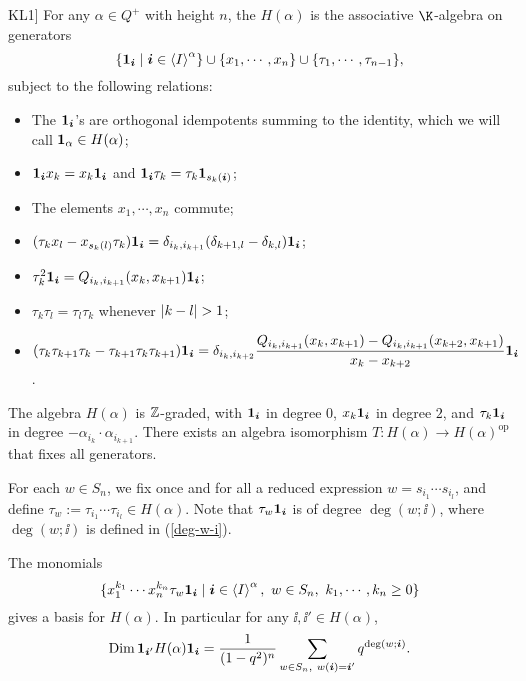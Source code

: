 \begin{definition}[\cite[Section 2.1]{KL1}]\label{def-of-KLR-alg}
    For any $\alpha\in Q^+$ with height $n$, the 
    $H(\alpha)$ is the associative $\K$-algebra on generators
    \[
        \{\mathbf{1}_{\boldsymbol{i}}\mid\boldsymbol{i}\in\left<I\right>^\alpha\}\cup\{x_1,\cdots,x_n\}
        \cup\{\tau_1,\cdots,\tau_{n-1}\},
    \]
    subject to the following relations:
    \begin{itemize}
        \item The $\mathbf{1}_{\boldsymbol{i}}$'s are orthogonal idempotents summing to the identity,
        which we will call $\mathbf{1}_\alpha\in H(\alpha)$;
        \item $\mathbf{1}_{\boldsymbol{i}} x_k = x_k \mathbf{1}_{\boldsymbol{i}}$ and $\mathbf{1}_{\boldsymbol{i}} \tau_k = \tau_k\mathbf{1}_{s_k(\boldsymbol{i})}$;
        \item The elements $x_1,\cdots,x_n$ commute;
        \item $(\tau_k x_l-x_{s_k(l)}\tau_k)\mathbf{1}_{\boldsymbol{i}}
         = \delta_{i_k,i_{k+1}}(\delta_{k+1,l}-\delta_{k,l})\mathbf{1}_{\boldsymbol{i}}$;
        \item $\tau_k^2\mathbf{1}_{\boldsymbol{i}} = Q_{i_k,i_{k+1}}(x_k,x_{k+1})\mathbf{1}_{\boldsymbol{i}}$;
        \item $\tau_k\tau_l = \tau_l\tau_k$ whenever $\abs{k-l}>1$;
        \item $(\tau_k\tau_{k+1}\tau_k-\tau_{k+1}\tau_k\tau_{k+1})\mathbf{1}_{\boldsymbol{i}}
         = \delta_{i_k,i_{k+2}}\dfrac{Q_{i_k,i_{k+1}}(x_k,x_{k+1})
        -Q_{i_k,i_{k+1}}(x_{k+2},x_{k+1})}{x_k-x_{k+2}}\mathbf{1}_{\boldsymbol{i}}$.
    \end{itemize}
\end{definition}

The algebra $H(\alpha)$ is $\mathbb{Z}$-graded,
with $\mathbf{1}_{\boldsymbol{i}}$ in degree $0$, $x_k\mathbf{1}_{\boldsymbol{i}}$ in degree $2$, and $\tau_k\mathbf{1}_{\boldsymbol{i}}$
in degree $-\alpha_{i_k}\cdot\alpha_{i_{k+1}}$. There exists an algebra
isomorphism $T\colon H(\alpha)\to H(\alpha)^{\mathrm{op}}$ that fixes all generators.

For each $w\in S_n$, we fix once and for all a reduced expression $w = s_{i_1}\cdots s_{i_l}$,
and define $\tau_w:= \tau_{i_1}\cdots\tau_{i_l}\in H(\alpha)$. Note that $\tau_w\mathbf{1}_{\boldsymbol{i}}$ is of degree
$\deg(w;\ii)$, where $\deg(w;\ii)$ is defined in (\ref{deg-w-i}).

\begin{proposition}[{\cite[Theorem 2.5]{KL1}}]\label{basis-of-H}
    The monomials 
    \[
        \{x_1^{k_1}\cdots x_n^{k_n}\tau_w\mathbf{1}_{\boldsymbol{i}}\mid
        \boldsymbol{i}\in\left<I\right>^\alpha,\ w\in S_n,\ k_1,\cdots,k_n\ge 0\}
    \] gives a basis
    for $H(\alpha)$. In particular for any $\ii,\ii'\in H(\alpha)$,
    \[
        \operatorname{Dim} \mathbf{1}_{\boldsymbol{i}'}H(\alpha)\mathbf{1}_{\boldsymbol{i}} = \dfrac1{(1-q^2)^n}
        \sum_{w\in S_n,\ w(\boldsymbol{i}) = \boldsymbol{i}'}q^{\deg(w;\boldsymbol{i})}.
    \]
\end{proposition}


